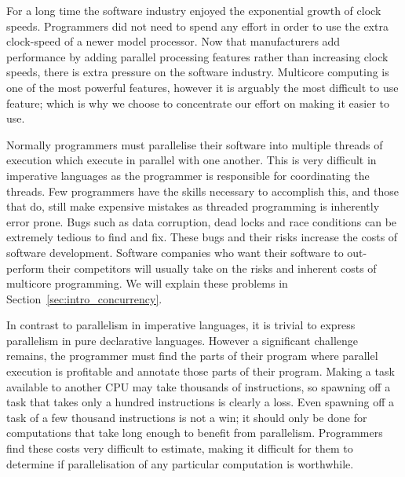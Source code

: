 For a long time the software industry enjoyed the exponential growth of
clock speeds.
Programmers did not need to spend any effort in order to use the extra
clock-speed of a newer model processor.
Now that manufacturers add performance by adding parallel processing
features rather than increasing clock speeds,
there is extra pressure on the software industry.
Multicore computing is one of the most powerful features,
however it is arguably the most difficult to use feature;
which is why we choose to concentrate our effort on making it easier to use.

Normally programmers must parallelise their software into multiple
threads of execution which execute in parallel with one another.
This is very difficult in imperative languages as the programmer is
responsible for coordinating the threads.
Few programmers have the skills necessary to accomplish this,
and those that do, still make expensive mistakes as
threaded programming is inherently error prone. 
Bugs such as data corruption, dead locks and race conditions
can be extremely tedious to find and fix.
These bugs and their risks increase the costs of software development.
Software companies who want their software to out-perform their competitors
will usually take on the risks and inherent costs of multicore programming.
We will explain these problems in Section~\ref{sec:intro_concurrency}.

In contrast to parallelism in imperative languages,
it is trivial to express parallelism in pure declarative languages.
However a significant challenge remains,
the programmer must find the parts of their program where parallel execution
is profitable and annotate those parts of their program.
Making a task available to another CPU
may take thousands of instructions,
so spawning off a task that takes only a hundred instructions is clearly a
loss.
Even spawning off a task of a few thousand instructions is not a win;
it should only be done for computations
that take long enough to benefit from parallelism.
Programmers find these costs very difficult to estimate,
making it difficult for them to determine if parallelisation of
any particular computation is worthwhile.

